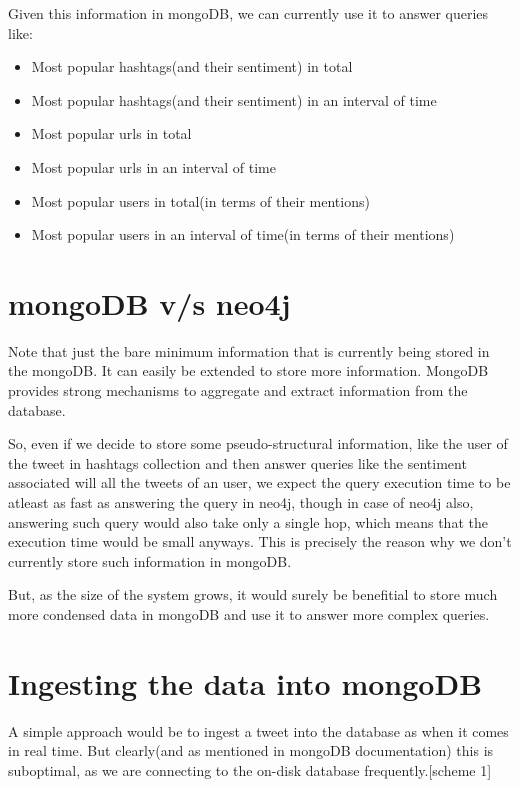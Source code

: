 \documentclass[letterpaper,10pt,english]{sphinxmanual}
\begin{document}
Given this information in mongoDB, we can currently use it to answer queries like:
\begin{itemize}
\item {} 
Most popular hashtags(and their sentiment) in total

\item {} 
Most popular hashtags(and their sentiment) in an interval of time

\item {} 
Most popular urls in total

\item {} 
Most popular urls in an interval of time

\item {} 
Most popular users in total(in terms of their mentions)

\item {} 
Most popular users in an interval of time(in terms of their mentions)

\end{itemize}


\section{mongoDB v/s neo4j}
\label{\detokenize{mongoDB_data_ingestion:mongodb-v-s-neo4j}}
Note that just the bare minimum information that is currently being stored in the mongoDB. It can easily be extended to store more information. MongoDB provides strong mechanisms to aggregate and extract information
from the database.

So, even if we decide to store some pseudo-structural information, like the user of the tweet in hashtags collection and then answer queries like the sentiment associated will all the tweets of an user, we expect the query execution time to be atleast as fast as answering the query in neo4j, though in case of neo4j also, answering such query would also take only a single hop, which means that the execution time would be small anyways. This is precisely the reason why we don’t currently store such information in mongoDB.

But, as the size of the system grows, it would surely be benefitial to store much more condensed data in mongoDB and use it to answer more complex queries.


\section{Ingesting the data into mongoDB}
\label{\detokenize{mongoDB_data_ingestion:ingesting-the-data-into-mongodb}}
A simple approach would be to ingest a tweet into the database as when it comes in real time. But clearly(and as mentioned in mongoDB documentation)
this is suboptimal, as we are connecting to the on-disk database frequently.{[}scheme 1{]}
\end{document}

